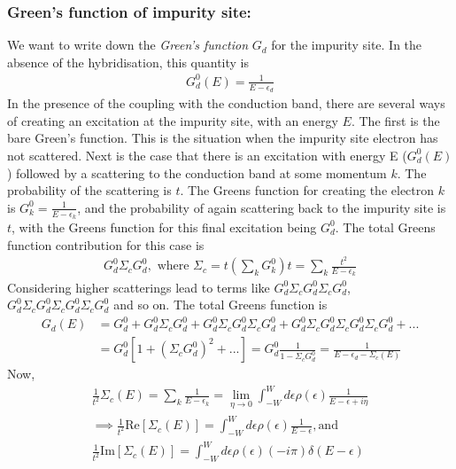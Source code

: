 \documentclass[twoside]{report}
\numberwithin{equation}{section}
\begin{document}
\subsubsection{Green's function of impurity site:}
We want to write down the \textit{Green's function} \(G_d\) for the impurity site.
In the absence of the hybridisation, this quantity is
\begin{equation}\begin{aligned}
G^0_d(E) = \frac{1}{E - \epsilon_d}
\end{aligned}\end{equation}
In the presence of the coupling with the conduction band, there are several ways of creating an excitation at the impurity site, with an energy \(E\).
The first is the bare Green's function.
This is the situation when the impurity site electron has not scattered.
Next is the case that there is an excitation with energy E (\(G^0_d(E)\)) followed by a scattering to the conduction band at some momentum \(k\).
The probability of the scattering is \(t\).
The Greens function for creating the electron \(k\) is \(G^0_k = \frac{1}{E-\epsilon_k}\), and the probability of again scattering back to the impurity site is \(t\), with the Greens function for this final excitation being \(G^0_d\).
The total Greens function contribution for this case is
\begin{equation}\begin{aligned}
	G^0_d \Sigma_c G^0_d, \text{  where  }\Sigma_c = t \left(\sum_k G^0_k\right) t = \sum_k \frac{t^2}{E - \epsilon_k}
\end{aligned}\end{equation}
Considering higher scatterings lead to terms like \(G^0_d \Sigma_c G^0_d\Sigma_c G^0_d\),\\\(G^0_d \Sigma_c G^0_d\Sigma_c G^0_d\Sigma_c G^0_d\) and so on.
The total Greens function is
\begin{equation}\begin{aligned}
G_d(E) &= G^0_d + G^0_d \Sigma_c G^0_d + G^0_d \Sigma_c G^0_d\Sigma_c G^0_d + G^0_d \Sigma_c G^0_d\Sigma_c G^0_d\Sigma_c G^0_d + ...
\\
       &= G^0_d\left[1+\left(\Sigma_c G^0_d\right)^2+...\right] = G^0_d \frac{1}{1-\Sigma_c G^0_d} = \frac{1}{E - \epsilon_d - \Sigma_c(E)} 
\end{aligned}\end{equation}
Now,
\begin{gather}
\frac{1}{t^2}\Sigma_c(E) = \sum_k \frac{1}{E - \epsilon_k} = \lim_{\eta \rightarrow 0}\int_{-W}^W d\epsilon \rho(\epsilon) \frac{1}{E - \epsilon + i\eta}\\
\implies \frac{1}{t^2}\text{Re} \left[\Sigma_c(E)\right] = \int_{-W}^W d\epsilon \rho(\epsilon)\frac{1}{E - \epsilon}, \text{and }\\
\frac{1}{t^2}\text{Im} \left[\Sigma_c(E)\right] = \int_{-W}^W d\epsilon \rho(\epsilon) (-i\pi)\delta(E-\epsilon)
\end{gather}
\end{document}
